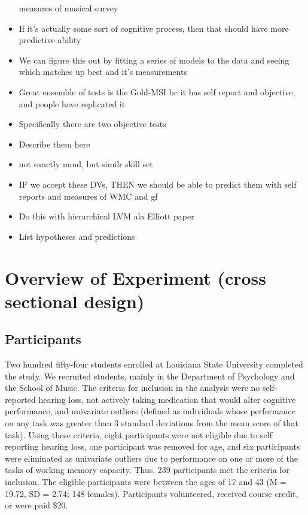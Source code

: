 \documentclass[]{book}
\theoremstyle{definition}
\theoremstyle{definition}
\theoremstyle{definition}
\theoremstyle{remark}
\begin{document}
\begin{itemize}
  measures of musical survey
\item
  If it's actually some sort of cognitive process, then that should have
  more predictive ability
\item
  We can figure this out by fitting a series of models to the data and
  seeing which matches up best and it's measurements
\item
  Great ensemble of tests is the Gold-MSI bc it has self report and
  objective, and people have replicated it
\item
  Specifically there are two objective tests
\item
  Describe them here
\item
  not exactly mmd, but similr skill set
\item
  IF we accept these DVs, THEN we should be able to predict them with
  self reports and measures of WMC and gf
\item
  Do this with hierarchical LVM ala Elliott paper
\item
  List hypotheses and predictions
\end{itemize}

\hypertarget{overview-of-experiment-cross-sectional-design}{%
\section{Overview of Experiment (cross sectional
design)}\label{overview-of-experiment-cross-sectional-design}}

\hypertarget{participants}{%
\subsection{Participants}\label{participants}}

Two hundred fifty-four students enrolled at Louisiana State University
completed the study. We recruited students, mainly in the Department of
Psychology and the School of Music. The criteria for inclusion in the
analysis were no self-reported hearing loss, not actively taking
medication that would alter cognitive performance, and univariate
outliers (defined as individuals whose performance on any task was
greater than 3 standard deviations from the mean score of that task).
Using these criteria, eight participants were not eligible due to self
reporting hearing loss, one participant was removed for age, and six
participants were eliminated as univariate outliers due to performance
on one or more of the tasks of working memory capacity. Thus, 239
participants met the criteria for inclusion. The eligible participants
were between the ages of 17 and 43 (M = 19.72, SD = 2.74; 148 females).
Participants volunteered, received course credit, or were paid \$20.
\end{document}
